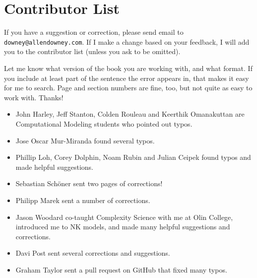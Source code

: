 \documentclass[12pt]{book}
\theoremstyle{exercise}
\begin{document}
\section*{Contributor List}


If you have a suggestion or correction, please send email to
{\tt downey@allendowney.com}.  If I make a change based on your
feedback, I will add you to the contributor list
(unless you ask to be omitted).

Let me know what version of the book you are working with, and
what format.  If you include at least part of the sentence the
error appears in, that makes it easy for me to search.  Page and
section numbers are fine, too, but not quite as easy to work with.
Thanks!

\small

\begin{itemize}

\item John Harley, Jeff Stanton, Colden Rouleau and
Keerthik Omanakuttan are Computational Modeling students who
pointed out typos.

\item Jose Oscar Mur-Miranda found several typos.

\item Phillip Loh, Corey Dolphin, Noam Rubin and Julian Ceipek
found typos and made helpful suggestions.


\item Sebastian Sch\"{o}ner sent two pages of corrections!

\item Philipp Marek sent a number of corrections.

\item Jason Woodard co-taught Complexity Science with me at Olin College, introduced me to NK models, and made many helpful suggestions and corrections.

\item Davi Post sent several corrections and suggestions.

\item Graham Taylor sent a pull request on GitHub that fixed many typos.


\end{itemize}
\end{document}
